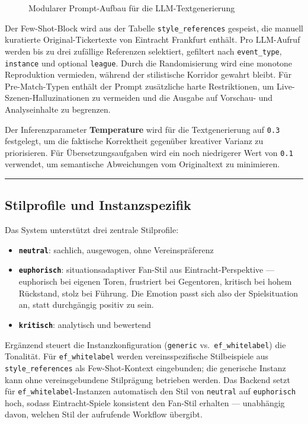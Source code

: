 \begin{figure}[H]
\centering
\DiagramPromptPipeline
\caption{Modularer Prompt-Aufbau für die LLM-Textgenerierung}
\label{fig:promptpipeline}
\end{figure}

Der Few-Shot-Block wird aus der Tabelle \texttt{style\_references}
gespeist, die manuell kuratierte Original-Tickertexte von Eintracht
Frankfurt enthält. Pro LLM-Aufruf werden bis zu drei zufällige
Referenzen selektiert, gefiltert nach \texttt{event\_type},
\texttt{instance} und optional \texttt{league}. Durch die Randomisierung
wird eine monotone Reproduktion vermieden, während der stilistische
Korridor gewahrt bleibt. Für Pre-Match-Typen enthält der Prompt
zusätzliche harte Restriktionen, um Live-Szenen-Halluzinationen zu
vermeiden und die Ausgabe auf Vorschau- und Analyseinhalte zu begrenzen.

Der Inferenzparameter \textbf{Temperature} wird für die Textgenerierung
auf \texttt{0.3} festgelegt, um die faktische Korrektheit gegenüber
kreativer Varianz zu priorisieren. Für Übersetzungsaufgaben wird ein
noch niedrigerer Wert von \texttt{0.1} verwendet, um semantische
Abweichungen vom Originaltext zu minimieren.

\begin{center}\rule{0.5\linewidth}{0.5pt}\end{center}

\subsection{Stilprofile und
Instanzspezifik}\label{stilprofile-und-instanzspezifik}

Das System unterstützt drei zentrale Stilprofile:

\begin{itemize}
\tightlist
\item
  \textbf{\texttt{neutral}}: sachlich, ausgewogen, ohne Vereinspräferenz
\item
  \textbf{\texttt{euphorisch}}: situationsadaptiver Fan-Stil aus
  Eintracht-Perspektive --- euphorisch bei eigenen Toren, frustriert bei
  Gegentoren, kritisch bei hohem Rückstand, stolz bei Führung. Die
  Emotion passt sich also der Spielsituation an, statt durchgängig
  positiv zu sein.
\item
  \textbf{\texttt{kritisch}}: analytisch und bewertend
\end{itemize}

Ergänzend steuert die Instanzkonfiguration (\texttt{generic}
vs.~\texttt{ef\_whitelabel}) die Tonalität. Für \texttt{ef\_whitelabel}
werden vereinsspezifische Stilbeispiele aus \texttt{style\_references}
als Few-Shot-Kontext eingebunden; die generische Instanz kann ohne
vereinsgebundene Stilprägung betrieben werden. Das Backend setzt für
\texttt{ef\_whitelabel}-Instanzen automatisch den Stil von
\texttt{neutral} auf \texttt{euphorisch} hoch, sodass Eintracht-Spiele
konsistent den Fan-Stil erhalten --- unabhängig davon, welchen Stil der
aufrufende Workflow übergibt.

